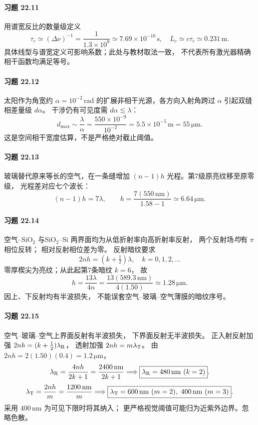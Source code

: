 \paragraph{习题 22.11}
用谱宽反比的数量级定义
\[
\boxed{\tau_c\simeq(\Delta\nu)^{-1}
=\frac1{1.3\times10^9}
\simeq7.69\times10^{-10}\,\mathrm s},
\quad
\boxed{L_c\simeq c\tau_c\simeq0.231\,\mathrm m}.
\]
具体线型与谱宽定义可影响系数；此处与教材取法一致，
不代表所有激光器精确相干函数均满足等号。

\paragraph{习题 22.12}
太阳作为角宽约 \(\alpha=10^{-2}\,\mathrm{rad}\)
的扩展非相干光源，各方向入射角跨过 \(\alpha\)
引起双缝相差量级 \(d\alpha\)。
干涉仍有可见度需 \(d\alpha\lesssim\lambda\)：
\[
\boxed{d_{\max}\sim\frac{\lambda}{\alpha}
=\frac{550\times10^{-9}}{10^{-2}}
=5.5\times10^{-5}\,\mathrm m=55\,\mathrm{\mu m}}.
\]
这是空间相干宽度估算，不是严格绝对截止阈值。

\paragraph{习题 22.13}
玻璃替代原来等长的空气，在一条缝增加
\((n-1)h\) 光程。第7级原亮纹移至原零级，
光程差对应七个波长：
\[
(n-1)h=7\lambda,\qquad
\boxed{h=\frac{7(550\,\mathrm{nm})}{1.58-1}
\simeq6.64\,\mathrm{\mu m}}.
\]

\paragraph{习题 22.14}
空气--SiO\(_2\) 与SiO\(_2\)--Si
两界面均为从低折射率向高折射率反射，
两个反射场\emph{均}有 \(\pi\) 相位反转；
相对反射相位差为零。
反射暗纹要求
\[
2nh=(k+\tfrac12)\lambda,\quad k=0,1,2,\ldots
\]
零厚楔尖为亮纹；从此起第7条暗纹 \(k=6\)，
故
\[
\boxed{h=\frac{13\lambda}{4n}
=\frac{13(589.3\,\mathrm{nm})}{4(1.50)}
\simeq1.28\,\mathrm{\mu m}}.
\]
因上、下反射均有半波损失，
不能误套空气--玻璃--空气薄膜的暗纹序号。

\paragraph{习题 22.15}
空气--玻璃--空气上界面反射有半波损失，
下界面反射无半波损失。
正入射反射加强
\(2nh=(k+\frac12)\lambda_{\rm R}\)，
透射加强 \(2nh=m\lambda_{\rm T}\)。
由 \(2nh=2(1.50)(0.4)=1.2\,\mathrm{\mu m}\)，
\[
\lambda_{\rm R}=\frac{4nh}{2k+1}
=\frac{2400\,\mathrm{nm}}{2k+1}
\Longrightarrow\boxed{\lambda_{\rm R}=480\,\mathrm{nm}\ (k=2)}.
\]
\[
\lambda_{\rm T}=\frac{2nh}{m}
=\frac{1200\,\mathrm{nm}}m
\Longrightarrow
\boxed{\lambda_{\rm T}=600\,\mathrm{nm}\ (m=2),\
400\,\mathrm{nm}\ (m=3)}.
\]
采用 \(400\,\mathrm{nm}\) 为可见下限时将其纳入；
更严格视觉阈值可能归为近紫外边界。忽略色散。

